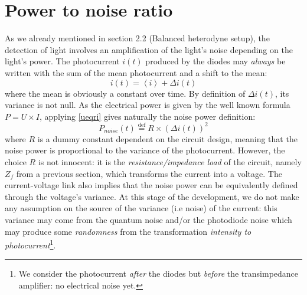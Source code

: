 \documentclass[11pt]{report}
\begin{document}
\section{Power to noise ratio}

As we already mentioned in section 2.2 (Balanced heterodyne setup), the detection of light involves an amplification of the light's noise depending on the light's power. The photocurrent $i(t)$ produced by the diodes may \textit{always} be written with the sum of the mean photocurrent and a shift to the mean:
\begin{equation}
\label{i_split_delta_i}
i(t) = \left\langle i \right\rangle + \Delta i(t)
\end{equation}
where the mean is obviously a constant over time. By definition of $\Delta i(t)$, its variance is not null. As the electrical power is given by the well known formula $P = U \times I$, applying \eqref{ueqri} gives naturally the noise power definition:
\begin{equation}
\label{def_p_noise}
P_{noise}(t) \stackrel{\text{def}}{=} R \times (\Delta i(t))^2 
\end{equation}
where $R$ is a dummy constant dependent on the circuit design, meaning that the noise power is proportional to the variance of the photocurrent. However, the choice $R$ is not innocent: it is the \textit{resistance/impedance load} of the circuit, namely $Z_f$ from a previous section, which transforms the current into a voltage. The current-voltage link also implies that the noise power can be equivalently defined through the voltage's variance. At this stage of the development, we do not make any assumption on the source of the variance (i.e noise) of the current: this variance may come from the quantum noise and/or the photodiode noise which may produce some \textit{randomness} from the transformation \textit{intensity to photocurrent}\footnote{We consider the photocurrent \textit{after} the diodes but \textit{before} the transimpedance amplifier: no electrical noise yet.}.
\end{document}
